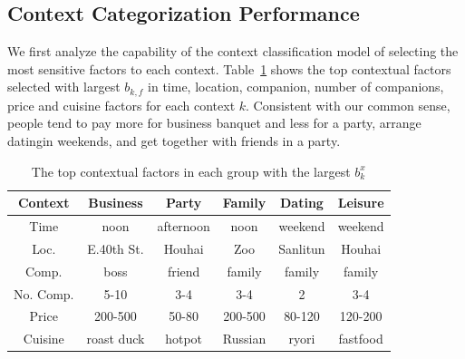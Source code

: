 \documentclass[sigconf]{acmart}
\begin{document}
\subsection{Context Categorization Performance}
We first analyze the capability of the context classification model of selecting the most sensitive factors to each context. Table~\ref{tab:factor} shows the top contextual factors selected with largest $b_{k,f}$ in time, location, companion, number of companions, price and cuisine factors for each context $k$. Consistent with our common sense, people tend to pay more for business banquet and less for a party, arrange datingin weekends, and get together with friends in a party.
\begin{table}\label{tab:factor}
\footnotesize
\centering
\caption{The top contextual factors in each group with the largest $b^x_k$}
\begin{tabular}{|c|c|c|c|c|c|}
  \hline
  Context & Business & Party & Family & Dating & Leisure \\\hline\hline
  Time & noon & afternoon & noon & weekend & weekend \\\hline
  Loc. & E.40th St. & Houhai& Zoo & Sanlitun & Houhai \\\hline
  Comp. & boss & friend & family & family & family \\\hline
  No. Comp. & 5-10 & 3-4 & 3-4 & 2 & 3-4 \\\hline
  Price & 200-500 & 50-80 & 200-500 & 80-120 & 120-200 \\\hline
  Cuisine & roast duck & hotpot &  Russian & ryori & fastfood \\\hline
\end{tabular}
\end{table}
\end{document}
